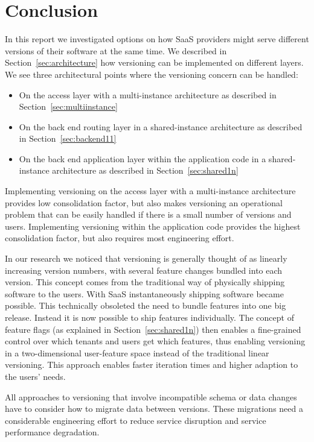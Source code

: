 
\section{Conclusion}
\label{sec:conclusion}

In this report we investigated options on how SaaS providers might serve different versions of their software at the same time. We described in Section~\ref{sec:architecture} how versioning can be implemented on different layers. We see three architectural points where the versioning concern can be handled:

\begin{itemize}
  \item On the access layer with a multi-instance architecture as described in Section~\ref{sec:multiinstance}
  \item On the back end routing layer in a shared-instance architecture as described in Section~\ref{sec:backend11}
  \item On the back end application layer within the application code in a shared-instance architecture as described in Section~\ref{sec:shared1n}
\end{itemize}

Implementing versioning on the access layer with a multi-instance architecture provides low consolidation factor, but also makes versioning an operational problem that can be easily handled if there is a small number of versions and users. Implementing versioning within the application code provides the highest consolidation factor, but also requires most engineering effort.

In our research we noticed that versioning is generally thought of as linearly increasing version numbers, with several feature changes bundled into each version. This concept comes from the traditional way of physically shipping software to the users. With SaaS instantaneously shipping software became possible. This technically obsoleted the need to bundle features into one big release. Instead it is now possible to ship features individually. The concept of feature flags (as explained in Section~\ref{sec:shared1n}) then enables a fine-grained control over which tenants and users get which features, thus enabling versioning in a two-dimensional user-feature space instead of the traditional linear versioning. This approach enables faster iteration times and higher adaption to the users' needs.

All approaches to versioning that involve incompatible schema or data changes have to consider how to migrate data between versions. These migrations need a considerable engineering effort to reduce service disruption and service performance degradation.

